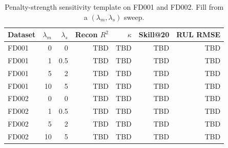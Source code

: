 \begin{table}[t]
\centering
\caption{Penalty-strength sensitivity template on FD001 and FD002. Fill from a $(\lambda_m,\lambda_s)$ sweep.}
\label{tab:lambda_sensitivity}
\begin{tabular}{lrrrrrr}
\toprule
Dataset & $\lambda_m$ & $\lambda_s$ & Recon $R^2$ & $\kappa$ & Skill@20 & RUL RMSE \\
\midrule
FD001 & 0 & 0 & TBD & TBD & TBD & TBD \\
FD001 & 1 & 0.5 & TBD & TBD & TBD & TBD \\
FD001 & 5 & 2 & TBD & TBD & TBD & TBD \\
FD001 & 10 & 5 & TBD & TBD & TBD & TBD \\
FD002 & 0 & 0 & TBD & TBD & TBD & TBD \\
FD002 & 1 & 0.5 & TBD & TBD & TBD & TBD \\
FD002 & 5 & 2 & TBD & TBD & TBD & TBD \\
FD002 & 10 & 5 & TBD & TBD & TBD & TBD \\
\bottomrule
\end{tabular}
\end{table}